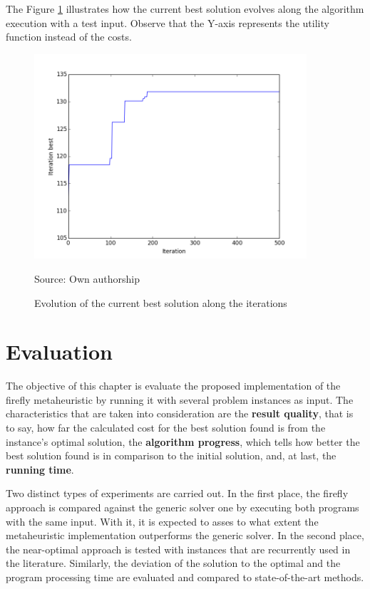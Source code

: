 \documentclass[tuberlin,cic,tc,openright,english,noabntcite,oneside]{iiufrgs}
\begin{document}
The Figure \ref{fig:best-solution-evolution} illustrates how the current best solution evolves along the algorithm  execution with a test input. Observe that the Y-axis represents the utility function instead of the costs.
\begin{figure}[H]
	\centering
    \caption{Evolution of the current best solution along the iterations}
    \includegraphics[width=0.9\textwidth]{fig_best_sol_evolution}\par
	Source: Own authorship
    \label{fig:best-solution-evolution}
\end{figure}

\chapter{Evaluation}
The objective of this chapter is evaluate the proposed implementation of the firefly metaheuristic by running it with several problem instances as input. The characteristics that are taken into consideration are the \textbf{result quality}, that is to say, how far the calculated cost for the best solution found is from the instance's optimal solution, the \textbf{algorithm progress}, which tells how better the best solution found is in comparison to the initial solution, and, at last, the \textbf{running time}.

Two distinct types of experiments are carried out. In the first place, the firefly approach is compared against the generic solver one by executing both programs with the same input. With it, it is expected to asses to what extent the metaheuristic implementation outperforms the generic solver. In the second place, the near-optimal approach is tested with instances that are recurrently used in the literature. Similarly, the deviation of the solution to the optimal and the program processing time are evaluated and compared to state-of-the-art methods.
\end{document}
